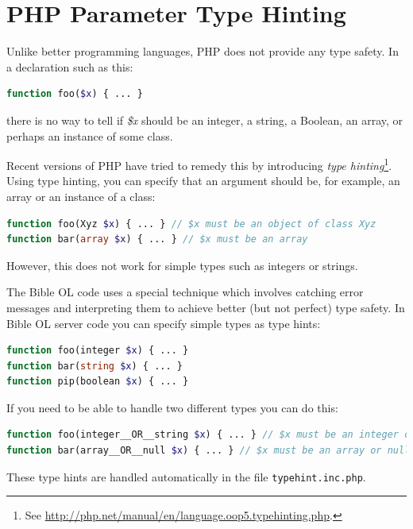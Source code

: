 \documentclass[11pt,oneside,a4paper]{memoir}
\begin{document}
\section{PHP Parameter Type Hinting}\label{php-typing}

Unlike better programming languages, PHP does not provide any type safety. In a declaration such as
this:

\begin{lstlisting}[language=PHP]
function foo($x) { ... }
\end{lstlisting}

\noindent
there is no way to tell if \emph{\$x} should be an integer, a string, a Boolean, an array, or perhaps an
instance of some class.

Recent versions of PHP have tried to remedy this by introducing \emph{type hinting}\footnote{See
  \url{http://php.net/manual/en/language.oop5.typehinting.php}.}. Using type hinting, you can specify
that an argument should be, for example, an array or an instance of a class:

\begin{lstlisting}[language=PHP]
function foo(Xyz $x) { ... } // $x must be an object of class Xyz
function bar(array $x) { ... } // $x must be an array
\end{lstlisting}

However, this does not work for simple types such as integers or strings.

The Bible OL code uses a special technique which involves catching error messages and interpreting them
to achieve better (but not perfect) type safety. In Bible OL server code you can specify simple types as type hints:

\begin{lstlisting}[language=PHP]
function foo(integer $x) { ... }
function bar(string $x) { ... }
function pip(boolean $x) { ... }
\end{lstlisting}

If you need to be able to handle two different types you can do this:

\begin{lstlisting}[language=PHP]
function foo(integer__OR__string $x) { ... } // $x must be an integer or a string
function bar(array__OR__null $x) { ... } // $x must be an array or null
\end{lstlisting}

These type hints are handled automatically in the file \texttt{typehint.inc.php}.
\end{document}
